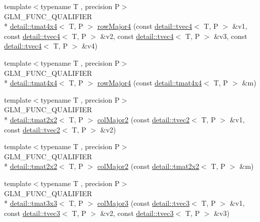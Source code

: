 \begin{DoxyCompactItemize}
\item 
{\footnotesize template$<$typename T , precision P$>$ }\\G\-L\-M\-\_\-\-F\-U\-N\-C\-\_\-\-Q\-U\-A\-L\-I\-F\-I\-E\-R \\*
\hyperlink{structglm_1_1detail_1_1tmat4x4}{detail\-::tmat4x4}$<$ T, P $>$ \hyperlink{group__gtx__matrix__major__storage_gaba5dbb8fa29fcf57c80daf43ca7cf9db}{row\-Major4} (const \hyperlink{structglm_1_1detail_1_1tvec4}{detail\-::tvec4}$<$ T, P $>$ \&v1, const \hyperlink{structglm_1_1detail_1_1tvec4}{detail\-::tvec4}$<$ T, P $>$ \&v2, const \hyperlink{structglm_1_1detail_1_1tvec4}{detail\-::tvec4}$<$ T, P $>$ \&v3, const \hyperlink{structglm_1_1detail_1_1tvec4}{detail\-::tvec4}$<$ T, P $>$ \&v4)
\item 
{\footnotesize template$<$typename T , precision P$>$ }\\G\-L\-M\-\_\-\-F\-U\-N\-C\-\_\-\-Q\-U\-A\-L\-I\-F\-I\-E\-R \\*
\hyperlink{structglm_1_1detail_1_1tmat4x4}{detail\-::tmat4x4}$<$ T, P $>$ \hyperlink{group__gtx__matrix__major__storage_ga1a797d9a3f0d6b81e50b4f1bef2ed281}{row\-Major4} (const \hyperlink{structglm_1_1detail_1_1tmat4x4}{detail\-::tmat4x4}$<$ T, P $>$ \&m)
\item 
{\footnotesize template$<$typename T , precision P$>$ }\\G\-L\-M\-\_\-\-F\-U\-N\-C\-\_\-\-Q\-U\-A\-L\-I\-F\-I\-E\-R \\*
\hyperlink{structglm_1_1detail_1_1tmat2x2}{detail\-::tmat2x2}$<$ T, P $>$ \hyperlink{group__gtx__matrix__major__storage_gae53863d1ced5629d5aa3ce04abf14ab1}{col\-Major2} (const \hyperlink{structglm_1_1detail_1_1tvec2}{detail\-::tvec2}$<$ T, P $>$ \&v1, const \hyperlink{structglm_1_1detail_1_1tvec2}{detail\-::tvec2}$<$ T, P $>$ \&v2)
\item 
{\footnotesize template$<$typename T , precision P$>$ }\\G\-L\-M\-\_\-\-F\-U\-N\-C\-\_\-\-Q\-U\-A\-L\-I\-F\-I\-E\-R \\*
\hyperlink{structglm_1_1detail_1_1tmat2x2}{detail\-::tmat2x2}$<$ T, P $>$ \hyperlink{group__gtx__matrix__major__storage_ga84d93f2dea8fd341232f0505038d50f6}{col\-Major2} (const \hyperlink{structglm_1_1detail_1_1tmat2x2}{detail\-::tmat2x2}$<$ T, P $>$ \&m)
\item 
{\footnotesize template$<$typename T , precision P$>$ }\\G\-L\-M\-\_\-\-F\-U\-N\-C\-\_\-\-Q\-U\-A\-L\-I\-F\-I\-E\-R \\*
\hyperlink{structglm_1_1detail_1_1tmat3x3}{detail\-::tmat3x3}$<$ T, P $>$ \hyperlink{group__gtx__matrix__major__storage_ga8bc9dc6fcd7017b7123a151d9f251013}{col\-Major3} (const \hyperlink{structglm_1_1detail_1_1tvec3}{detail\-::tvec3}$<$ T, P $>$ \&v1, const \hyperlink{structglm_1_1detail_1_1tvec3}{detail\-::tvec3}$<$ T, P $>$ \&v2, const \hyperlink{structglm_1_1detail_1_1tvec3}{detail\-::tvec3}$<$ T, P $>$ \&v3)

\end{DoxyCompactItemize}
